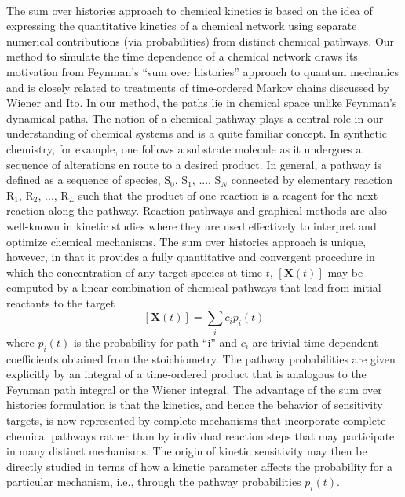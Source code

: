 \paragraph{}
The sum over histories approach to chemical kinetics is
based on the idea of expressing the quantitative kinetics of a
chemical network using separate numerical contributions (via
probabilities) from distinct chemical pathways. Our method to
simulate the time dependence of a chemical network draws its
motivation from Feynman’s “sum over histories” approach to
quantum mechanics\cite{ch3_7_feynman1965quantum} and is closely related to treatments of
time-ordered Markov chains\cite{ch3_8_van1992stochastic} discussed by Wiener\cite{ch3_9_gardiner1985handbook} and Ito.\cite{ch3_10_ito1961wiener}
In our method, the paths lie in chemical space unlike
Feynman’s dynamical paths. The notion of a chemical pathway
plays a central role in our understanding of chemical systems
and is a quite familiar concept. In synthetic chemistry, for
example, one follows a substrate molecule as it undergoes a
sequence of alterations en route to a desired product. In
general, a pathway is defined as a sequence of species, S$_0$, S$_1$, ...,
S$_N$ connected by elementary reaction R$_1$, R$_2$, ..., R$_L$ such that the
product of one reaction is a reagent for the next reaction along
the pathway. Reaction pathways and graphical methods are also
well-known in kinetic studies where they are used effectively to
interpret and optimize chemical mechanisms.\cite{ch3_11_temkin1996chemical,ch3_12_chern1990effective,ch3_13_lu2005directed,ch3_14_lehmann2004algorithm,ch3_15_he2008graph,ch3_16_feng2010dominant,ch3_17_kee2008chemkin} The sum over histories approach is unique, however, in that it provides a
fully quantitative and convergent procedure in which the
concentration of any target species at time $t$, $\left[ \textbf{X}(t)\right]$ may be
computed by a linear combination of chemical pathways that
lead from initial reactants to the target
\begin{equation}
\label{ch3:eqn1}
\left[ \textbf{X}(t) \right] = \sum_{i} {c_ip_i(t)}
\end{equation}
where $p_i(t)$ is the probability for path “i” and $c_i$ are trivial time-dependent
coefficients obtained from the stoichiometry. The
pathway probabilities are given explicitly by an integral of a
time-ordered product that is analogous to the Feynman path
integral or the Wiener integral. The advantage of the sum over
histories formulation is that the kinetics, and hence the
behavior of sensitivity targets, is now represented by complete
mechanisms that incorporate complete chemical pathways
rather than by individual reaction steps that may participate in
many distinct mechanisms. The origin of kinetic sensitivity may
then be directly studied in terms of how a kinetic parameter
affects the probability for a particular mechanism, i.e., through
the pathway probabilities $p_i(t)$.
\newline
